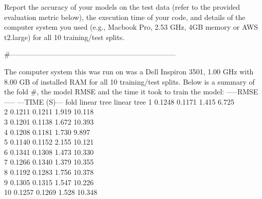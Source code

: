 \documentclass[
]{article}
\begin{document}
Report the accuracy of your models on the test data (refer to the
provided evaluation metric below), the execution time of your code, and
details of the computer system you used (e.g., Macbook Pro, 2.53 GHz,
4GB memory or AWS t2.large) for all 10 training/test splits.

\#---------------------------------------------------------------------

The computer system this was run on was a Dell Inspiron 3501, 1.00 GHz
with 8.00 GB of installed RAM for all 10 training/test splits. Below is
a summary of the fold \#, the model RMSE and the time it took to train
the model: -----RMSE----- ---TIME (S)--- fold linear tree linear tree 1
0.1248 0.1171 1.415 6.725\\
2 0.1211 0.1211 1.919 10.118\\
3 0.1201 0.1138 1.672 10.393\\
4 0.1208 0.1181 1.730 9.897\\
5 0.1140 0.1152 2.155 10.121\\
6 0.1341 0.1308 1.473 10.330\\
7 0.1266 0.1340 1.379 10.355\\
8 0.1192 0.1283 1.756 10.378\\
9 0.1305 0.1315 1.547 10.226\\
10 0.1257 0.1269 1.528 10.348
\end{document}
